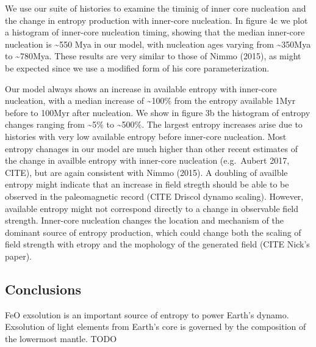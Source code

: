 \documentclass[]{article}
\begin{document}
We use our suite of histories to examine the timinig of inner core
nucleation and the change in entropy production with inner-core
nucleation. In figure 4c we plot a histogram of inner-core nucleation
timing, showing that the median inner-core nucleation is
\textasciitilde{}550 Mya in our model, with nucleation ages varying from
\textasciitilde{}350Mya to \textasciitilde{}780Mya. These results are
very similar to those of Nimmo (2015), as might be expected since we use
a modified form of his core parameterization.

Our model always shows an increase in available entropy with inner-core
nucleation, with a median increase of \textasciitilde{}100\% from the
entropy available 1Myr before to 100Myr after nucleation. We show in
figure 3b the histogram of entropy changes ranging from
\textasciitilde{}5\% to \textasciitilde{}500\%. The largest entropy
increases arise due to histories with very low available entropy before
inner-core nucleation. Most entropy chanages in our model are much
higher than other recent estimates of the change in availble entropy
with inner-core nucleation (e.g.~Aubert 2017, CITE), but are again
consistent with Nimmo (2015). A doubling of availble entropy might
indicate that an increase in field stregth should be able to be observed
in the paleomagnetic record (CITE Driscol dynamo scaling). However,
available entropy might not correspond directly to a change in
observable field strength. Inner-core nucleation changes the location
and mechanism of the dominant source of entropy production, which could
change both the scaling of field strength with etropy and the mophology
of the generated field (CITE Nick's paper).

\hypertarget{conclusions}{%
\subsection{Conclusions}\label{conclusions}}

FeO exsolution is an important source of entropy to power Earth's
dynamo. Exsolution of light elements from Earth's core is governed by
the composition of the lowermost mantle. TODO
\end{document}
